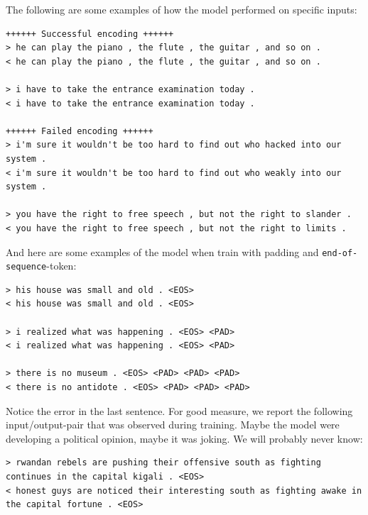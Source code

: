 \documentclass{article}
\begin{document}
%

The following are some examples of how the model performed on specific inputs:

\begin{verbatim}
++++++ Successful encoding ++++++
> he can play the piano , the flute , the guitar , and so on .
< he can play the piano , the flute , the guitar , and so on .

> i have to take the entrance examination today .
< i have to take the entrance examination today .

++++++ Failed encoding ++++++
> i'm sure it wouldn't be too hard to find out who hacked into our system .
< i'm sure it wouldn't be too hard to find out who weakly into our system .

> you have the right to free speech , but not the right to slander .
< you have the right to free speech , but not the right to limits .
\end{verbatim}

And here are some examples of the model when train with padding and
\texttt{end-of-sequence}-token:

\begin{verbatim}
> his house was small and old . <EOS>
< his house was small and old . <EOS>

> i realized what was happening . <EOS> <PAD>
< i realized what was happening . <EOS> <PAD>

> there is no museum . <EOS> <PAD> <PAD> <PAD>
< there is no antidote . <EOS> <PAD> <PAD> <PAD>
\end{verbatim}

Notice the error in the last sentence. For good measure, we report the following
input/output-pair that was observed during training. Maybe the model were
developing a political opinion, maybe it was joking. We will probably never
know:

\begin{verbatim}
> rwandan rebels are pushing their offensive south as fighting continues in the capital kigali . <EOS>
< honest guys are noticed their interesting south as fighting awake in the capital fortune . <EOS>
\end{verbatim}
\end{document}
